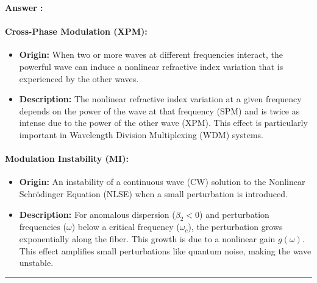 \documentclass[a4paper,11pt]{book}
\newcounter{qacount}
\newenvironment{answer}{
  \noindent\textbf{Answer \theqacount:}\space
}{
  \par\vspace{1em}   %
  \hrule             %
  \vspace{0.5em}     %
}
\begin{document}
\begin{answer}
    \paragraph{Cross-Phase Modulation (XPM):}
    \begin{itemize}
        \item \textbf{Origin:} When two or more waves at different frequencies interact, the powerful wave can induce a nonlinear refractive index variation that is experienced by the other waves.
        \item \textbf{Description:} The nonlinear refractive index variation at a given frequency depends on the power of the wave at that frequency (SPM) and is twice as intense due to the power of the other wave (XPM). This effect is particularly important in Wavelength Division Multiplexing (WDM) systems.
    \end{itemize}

    \paragraph{Modulation Instability (MI):}
    \begin{itemize}
        \item \textbf{Origin:} An instability of a continuous wave (CW) solution to the Nonlinear Schrödinger Equation (NLSE) when a small perturbation is introduced.
        \item \textbf{Description:} For anomalous dispersion ($\beta_2 < 0$) and perturbation frequencies ($\omega$) below a critical frequency ($\omega_c$), the perturbation grows exponentially along the fiber. This growth is due to a nonlinear gain $g(\omega)$. This effect amplifies small perturbations like quantum noise, making the wave unstable.
    \end{itemize}
\end{answer}
\end{document}
